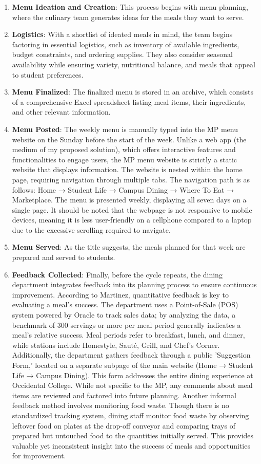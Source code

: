 \documentclass[10pt,twocolumn]{article}
\begin{document}
 

\begin{enumerate}
    \item \textbf{Menu Ideation and Creation}: This process begins with menu planning, where the culinary team generates ideas for the meals they want to serve.
    \item \textbf{Logistics}: With a shortlist of ideated meals in mind, the team begins factoring in essential logistics, such as inventory of available ingredients, budget constraints, and ordering supplies. They also consider seasonal availability while ensuring variety, nutritional balance, and meals that appeal to student preferences. 
     \item \textbf{Menu Finalized}: The finalized menu is stored in an archive, which consists of a comprehensive Excel spreadsheet listing meal items, their ingredients, and other relevant information.
     \item \textbf{Menu Posted}: The weekly menu is manually typed into the MP menu website on the Sunday before the start of the week. Unlike a web app (the medium of my proposed solution), which offers interactive features and functionalities to engage users, the MP menu website is strictly a static website that displays information.  The website is nested within the home page, requiring navigation through multiple tabs. The navigation path is as follows: Home → Student Life → Campus Dining → Where To Eat → Marketplace. The menu is presented weekly, displaying all seven days on a single page. It should be noted that the webpage is not responsive to mobile devices, meaning it is less user-friendly on a cellphone compared to a laptop due to the excessive scrolling required to navigate.
   \item \textbf{Menu Served}: As the title suggests, the meals planned for that week are prepared and served to students.
      \item \textbf{Feedback Collected}:  Finally, before the cycle repeats, the dining department integrates feedback into its planning process to ensure continuous improvement. According to Martinez, quantitative feedback is key to evaluating a meal's success. The department uses a Point-of-Sale (POS) system powered by Oracle to track sales data; by analyzing the data, a benchmark of 300 servings or more per meal period generally indicates a meal's relative success. Meal periods refer to breakfast, lunch, and dinner, while stations include Homestyle, Sauté, Grill, and Chef's Corner. Additionally, the department gathers feedback through a public 'Suggestion Form,' located on a separate subpage of the main website (Home → Student Life → Campus Dining). This form addresses the entire dining experience at Occidental College. While not specific to the MP, any comments about meal items are reviewed and factored into future planning. Another informal feedback method involves monitoring food waste. Though there is no standardized tracking system, dining staff monitor food waste by observing leftover food on plates at the drop-off conveyor and comparing trays of prepared but untouched food to the quantities initially served. This provides valuable yet inconsistent insight into the success of meals and opportunities for improvement.
\end{enumerate}
\end{document}
